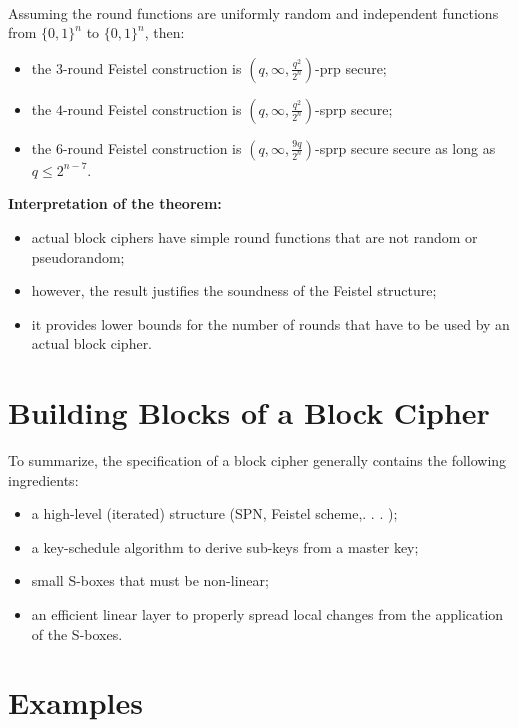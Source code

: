 \begin{theorem}\ \\
	Assuming the round functions are uniformly random and independent
	functions from $\{0,1\}^n$ to $\{0,1\}^n$, then:
	\begin{itemize}
	    \item the $3$-round Feistel construction is $(q,\infty,\frac{q^2}{2^n})$-prp secure;
	    \item the $4$-round Feistel construction is $(q,\infty,\frac{q^2}{2^n})$-sprp secure;
	    \item the $6$-round Feistel construction is $(q,\infty,\frac{9q}{2^n})$-sprp secure secure as long as $q \leq 2^{n-7}$.\
	\end{itemize}

	\textbf{Interpretation of the theorem:}
	\begin{itemize}
	    \item actual block ciphers have simple round functions that are not random or pseudorandom;
	    \item however, the result justifies the soundness of the Feistel structure;
	    \item it provides lower bounds for the number of rounds that have to be used by an actual block cipher.
	\end{itemize}
	\end{theorem}


\section{Building Blocks of a Block Cipher}
	To summarize, the specification of a block cipher generally contains the following ingredients:
	\begin{itemize}
	    \item a high-level (iterated) structure (SPN, Feistel scheme,. . . );
	    \item a key-schedule algorithm to derive sub-keys from a master key;
	    \item small S-boxes that must be non-linear;
	    \item an efficient linear layer to properly spread local changes from the application of the S-boxes.
	\end{itemize}

\newpage
\section{Examples}
